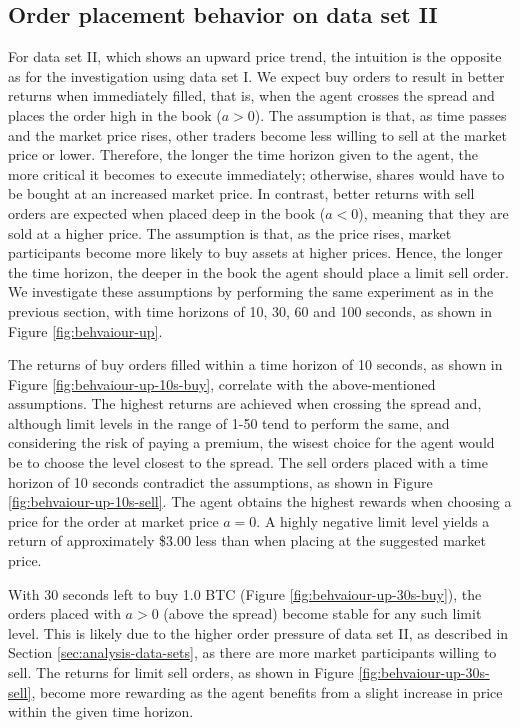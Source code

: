\subsection{Order placement behavior on data set II}
For data set II, which shows an upward price trend, the intuition is the opposite as for the investigation using data set I.
We expect buy orders to result in better returns when immediately filled, that is, when the agent crosses the spread and places the order high in the book ($a>0$).
The assumption is that, as time passes and the market price rises, other traders become less willing to sell at the market price or lower.
Therefore, the longer the time horizon given to the agent, the more critical it becomes to execute immediately;  otherwise, shares would have to be bought at an increased market price.
In contrast, better returns with sell orders are expected when placed deep in the book ($a<0$), meaning that they are sold at a higher price.
The assumption is that, as the price rises, market participants become more likely to buy assets at higher prices.
Hence, the longer the time horizon, the deeper in the book the agent should place a limit sell order.
We investigate these assumptions by performing the same experiment as in the previous section, with time horizons of 10, 30, 60 and 100 seconds, as shown in Figure \ref{fig:behvaiour-up}.

The returns of buy orders filled within a time horizon of 10 seconds, as shown in Figure \ref{fig:behvaiour-up-10s-buy}, correlate with the above-mentioned assumptions.
The highest returns are achieved when crossing the spread and, although limit levels in the range of 1-50 tend to perform the same, and considering the risk of paying a premium, the wisest choice for the agent would be to choose the level closest to the spread.
The sell orders placed with a time horizon of 10 seconds contradict the assumptions, as shown in Figure \ref{fig:behvaiour-up-10s-sell}.
The agent obtains the highest rewards when choosing a price for the order at market price $a=0$.
A highly negative limit level yields a return of  approximately \$3.00 less than when placing at the suggested market price.

With 30 seconds left to buy 1.0 BTC (Figure \ref{fig:behvaiour-up-30s-buy}), the orders placed with $a>0$ (above the spread) become stable for any such limit level.
This is likely due to the higher order pressure of data set II, as described in Section \ref{sec:analysis-data-sets}, as there are more market participants willing to sell.
The returns for limit sell orders, as shown in Figure \ref{fig:behvaiour-up-30s-sell}, become more rewarding as the agent benefits from a slight increase in price within the given time horizon.

